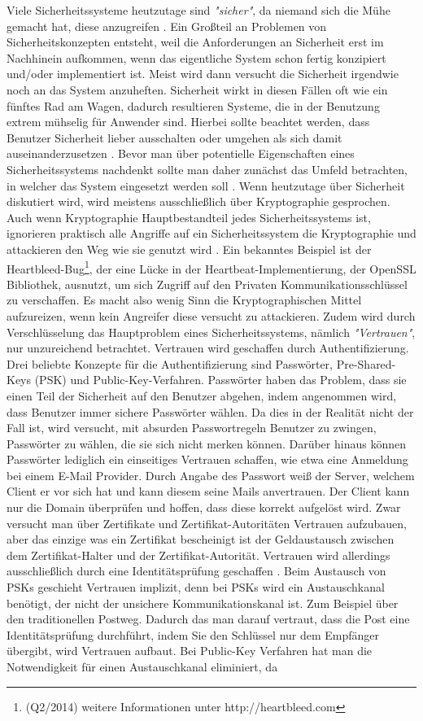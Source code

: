 \documentclass[11pt,a4paper]{report}
\begin{document}
Viele Sicherheitssysteme heutzutage sind \textit{"sicher"}, da niemand sich die Mühe gemacht hat, diese anzugreifen \cite{gutmann0}. Ein Großteil an Problemen von Sicherheitskonzepten entsteht, weil die Anforderungen an Sicherheit erst im Nachhinein aufkommen, wenn das eigentliche System schon fertig konzipiert und/oder implementiert ist. Meist wird dann versucht die Sicherheit irgendwie noch an das System anzuheften. Sicherheit wirkt in diesen Fällen oft wie ein fünftes Rad am Wagen, dadurch resultieren Systeme, die in der Benutzung extrem mühselig für Anwender sind. Hierbei sollte beachtet werden, dass Benutzer Sicherheit lieber ausschalten oder umgehen als sich damit auseinanderzusetzen \cite{gutmann5}. Bevor man über potentielle Eigenschaften eines Sicherheitssystems nachdenkt sollte man daher zunächst das Umfeld betrachten, in welcher das System eingesetzt werden soll \cite{gutmann4}. Wenn heutzutage über Sicherheit diskutiert wird, wird meistens ausschließlich über Kryptographie gesprochen. Auch wenn Kryptographie Hauptbestandteil jedes Sicherheitssystems ist, ignorieren praktisch alle Angriffe auf ein Sicherheitssystem die Kryptographie und attackieren den Weg wie sie genutzt wird \cite{gutmann1}. Ein bekanntes Beispiel ist der Heartbleed-Bug\footnote{(Q2/2014) weitere Informationen unter http://heartbleed.com}, der eine Lücke in der Heartbeat-Implementierung, der OpenSSL Bibliothek, ausnutzt, um sich Zugriff auf den Privaten Kommunikationsschlüssel zu verschaffen. Es macht also wenig Sinn die Kryptographischen Mittel aufzureizen, wenn kein Angreifer diese versucht zu attackieren. Zudem wird durch Verschlüsselung das Hauptproblem eines Sicherheitssystems, nämlich \textit{"Vertrauen"}, nur unzureichend betrachtet. Vertrauen wird geschaffen durch Authentifizierung. Drei beliebte Konzepte für die Authentifizierung sind Passwörter, Pre-Shared-Keys (PSK) und Public-Key-Verfahren. Passwörter haben das Problem, dass sie einen Teil der Sicherheit auf den Benutzer abgehen, indem angenommen wird, dass Benutzer immer sichere Passwörter wählen. Da dies in der Realität nicht der Fall ist, wird versucht, mit absurden Passwortregeln Benutzer zu zwingen, Passwörter zu wählen, die sie sich nicht merken können. Darüber hinaus können Passwörter lediglich ein einseitiges Vertrauen schaffen, wie etwa eine Anmeldung bei einem E-Mail Provider. Durch Angabe des Passwort weiß der Server, welchem Client er vor sich hat und kann diesem seine Mails anvertrauen. Der Client kann nur die Domain überprüfen und hoffen, dass diese korrekt aufgelöst wird. Zwar versucht man über Zertifikate und Zertifikat-Autoritäten Vertrauen aufzubauen, aber das einzige was ein Zertifikat bescheinigt ist der Geldaustausch zwischen dem Zertifikat-Halter und der Zertifikat-Autorität. Vertrauen wird allerdings ausschließlich durch eine Identitätsprüfung geschaffen \cite{gutmann8}. Beim Austausch von PSKs geschieht Vertrauen implizit, denn bei PSKs wird ein Austauschkanal benötigt, der nicht der unsichere Kommunikationskanal ist. Zum Beispiel über den traditionellen Postweg. Dadurch das man darauf vertraut, dass die Post eine Identitätsprüfung durchführt, indem Sie den Schlüssel nur dem Empfänger übergibt, wird Vertrauen aufbaut. Bei Public-Key Verfahren hat man die Notwendigkeit für einen Austauschkanal eliminiert, da 
\end{document}
